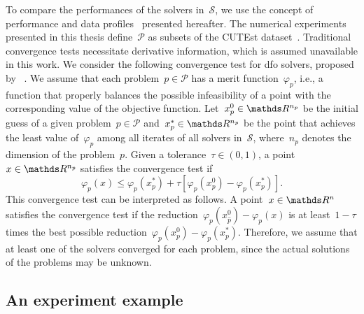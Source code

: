 To compare the performances of the solvers in~$\mathcal{S}$, we use the concept of performance and data profiles~\cite{Dolan_More_2002,More_Wild_2009} presented hereafter.
The numerical experiments presented in this thesis define~$\mathcal{P}$ as subsets of the CUTEst dataset~\cite{Gould_Orban_Toint_2015}.
Traditional convergence tests necessitate derivative information, which is assumed unavailable in this work.
We consider the following convergence test for \gls{dfo} solvers, proposed by \citeauthor{More_Wild_2009}~\cite{More_Wild_2009}.
We assume that each problem~$p \in \mathcal{P}$ has a merit function~$\varphi_p$, i.e., a function that properly balances the possible infeasibility of a point with the corresponding value of the objective function.
Let~$x_p^0 \in \R^{n_p}$ be the initial guess of a given problem~$p \in \mathcal{P}$ and~$x_p^{\ast} \in \R^{n_p}$ be the point that achieves the least value of~$\varphi_p$ among all iterates of all solvers in~$\mathcal{S}$, where~$n_p$ denotes the dimension of the problem~$p$.
Given a tolerance~$\tau \in (0, 1)$, a point~$x \in \R^{n_p}$ satisfies the convergence test if
\begin{equation*}
    \varphi_p(x) \le \varphi_p(x_p^{\ast}) + \tau [\varphi_p(x_p^0) - \varphi_p(x_p^{\ast})].
\end{equation*}
This convergence test can be interpreted as follows.
A point~$x \in \R^n$ satisfies the convergence test if the reduction~$\varphi_p(x_{\hat{p}}^0) - \varphi_p(x)$ is at least~$1 - \tau$ times the best possible reduction~$\varphi_p(x_p^0) - \varphi_p(x_p^{\ast})$.
Therefore, we assume that at least one of the solvers converged for each problem, since the actual solutions of the problems may be unknown.

\subsection{An experiment example}
\label{subsec:experiment-example}

